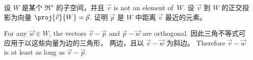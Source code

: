 \begin{exercises}
\item 设 $W$ 是某个 $\Re^n$ 的子空间，并且
  $\vec{v}$ is not an element of~$W$.
  设 $\vec{v}$ 到 $W$ 的正交投影为向量
  $\proj{\vec{v}}{W}=\vec{p}$.
  证明 $\vec{p}$ 是 $W$ 中距离 $\vec{v}$ 最近的元素。
  \begin{answer}
    For any $\vec{w}\in W$, the vectors $\vec{v}-\vec{p}$ and
    $\vec{p}-\vec{w}$ are orthogonal.
    因此三角不等式可应用于以这些向量为边的三角形，
    两边，且以 $\vec{v}-\vec{w}$ 为斜边。
    Therefore $\vec{v}-\vec{w}$ is at least as long as $\vec{v}-\vec{p}$.
  \end{answer}

   





\end{exercises}
%
%
%







